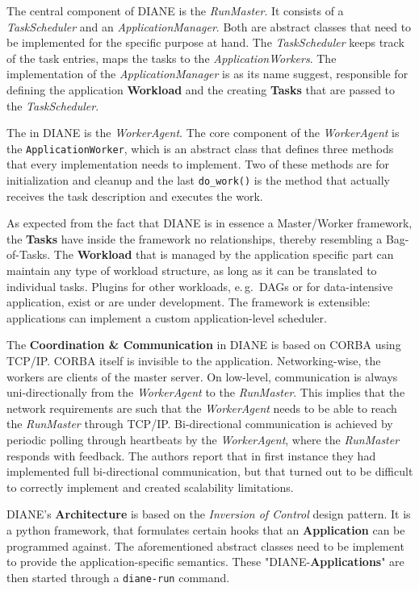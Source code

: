 \documentclass{sig-alternate}
\begin{document}
The central component of DIANE is the \textit{RunMaster}.
It consists of a \textit{TaskScheduler} and an \textit{ApplicationManager}.
Both are abstract classes that need to be implemented for the specific purpose
at hand.
The \textit{TaskScheduler} keeps track of the task entries, maps the tasks to
the \textit{ApplicationWorkers}.
The implementation of the \textit{ApplicationManager} is as its name suggest,
responsible for defining the application \textbf{Workload} and the creating
\textbf{Tasks} that are passed to the \textit{TaskScheduler}.

The \pilot in DIANE is the \textit{WorkerAgent}.
The core component of the \textit{WorkerAgent} is the
\texttt{ApplicationWorker}, which is an abstract class that defines three
methods that every implementation needs to implement.
Two of these methods are for initialization and cleanup and the last
\texttt{do\_work()} is the method that actually receives the task description
and executes the work.

As expected from the fact that DIANE is in essence a Master/Worker framework,
the \textbf{Tasks} have inside the framework no relationships, thereby
resembling a Bag-of-Tasks.
The \textbf{Workload} that is managed by the application specific part can
maintain any type of workload structure, as long as it can be translated to
individual tasks\cite{diane-dag, diane-etc}.
Plugins for other workloads, e.\,g.\ DAGs or for data-intensive
application, exist or are under development. The framework is extensible:
applications can implement a custom application-level scheduler.

The \textbf{Coordination \& Communication} in DIANE is based on CORBA using
TCP/IP.
CORBA itself is invisible to the application.
Networking-wise, the workers are clients of the master server.
On low-level, communication is always uni-directionally from the
\textit{WorkerAgent} to the \textit{RunMaster}.
This implies that the network requirements are such that the
\textit{WorkerAgent} needs to be able to reach the \textit{RunMaster} through
TCP/IP.
Bi-directional communication is achieved by periodic polling through
heartbeats by the \textit{WorkerAgent}, where the \textit{RunMaster} responds
with feedback.
The authors report that in first instance they had implemented full
bi-directional communication, but that turned out to be difficult to correctly
implement and created scalability limitations.

DIANE's \textbf{Architecture} is based on the \textit{Inversion of Control}
design pattern.
It is a python framework, that formulates certain hooks that an
\textbf{Application} can be programmed against. The aforementioned abstract
classes need to be implement to provide the application-specific semantics.
These "DIANE-\textbf{Applications}" are then started through a
\texttt{diane-run} command.
\end{document}
